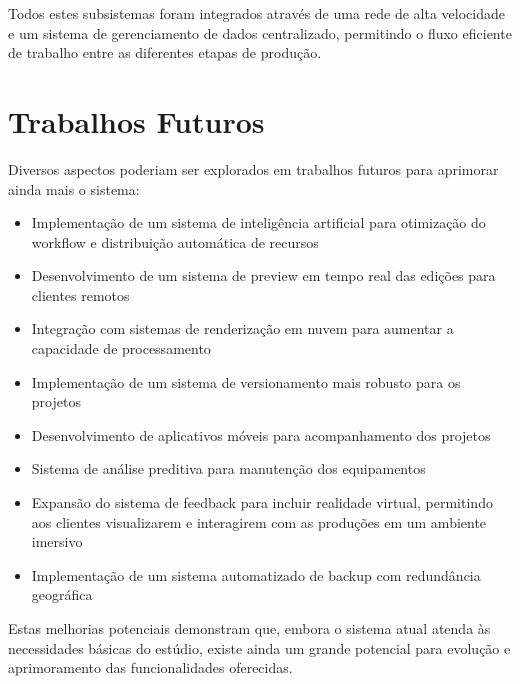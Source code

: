 Todos estes subsistemas foram integrados através de uma rede de alta velocidade e um sistema de gerenciamento de dados centralizado, permitindo o fluxo eficiente de trabalho entre as diferentes etapas de produção.

\section{Trabalhos Futuros}
Diversos aspectos poderiam ser explorados em trabalhos futuros para aprimorar ainda mais o sistema:

\begin{itemize}
    \item Implementação de um sistema de inteligência artificial para otimização do workflow e distribuição automática de recursos
    \item Desenvolvimento de um sistema de preview em tempo real das edições para clientes remotos
    \item Integração com sistemas de renderização em nuvem para aumentar a capacidade de processamento
    \item Implementação de um sistema de versionamento mais robusto para os projetos
    \item Desenvolvimento de aplicativos móveis para acompanhamento dos projetos
    \item Sistema de análise preditiva para manutenção dos equipamentos
    \item Expansão do sistema de feedback para incluir realidade virtual, permitindo aos clientes visualizarem e interagirem com as produções em um ambiente imersivo
    \item Implementação de um sistema automatizado de backup com redundância geográfica
\end{itemize}

Estas melhorias potenciais demonstram que, embora o sistema atual atenda às necessidades básicas do estúdio, existe ainda um grande potencial para evolução e aprimoramento das funcionalidades oferecidas.
